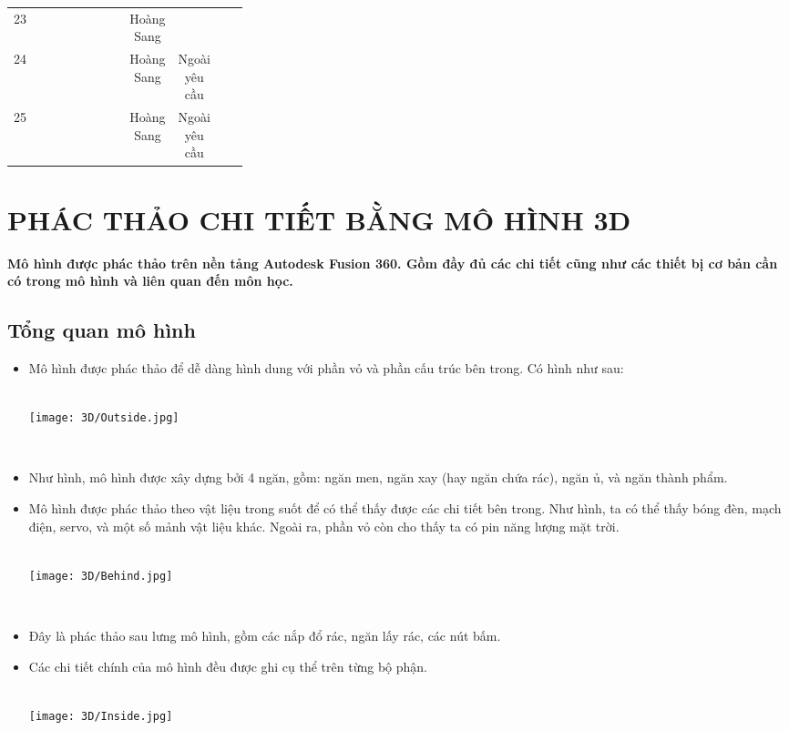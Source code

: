 \documentclass[12pt, a4paper]{article}
\begin{document}
\begin{table}[!H]
\begin{tabular}{|c|c|c|p{0.3\linewidth}|c|c|c|c|}
    23 & \centering{17/8/2023} & \centering{23/8/2023} & \centering{Báo cáo chi tiết} & Hoàng Sang &  \\ \cline{1-6}

    24 & \centering{10/8/2023} & \centering{15/8/2023} & \centering{Tìm hiểu về JSON và cách làm việc với JSON bằng Node-red, JS và C++} & Hoàng Sang &  Ngoài yêu cầu \\ \cline{1-6}

    25 & \centering{10/8/2023} & \centering{15/8/2023} & \centering{Tạo bộ api từ mạch gửi lên website} & Hoàng Sang & Ngoài yêu cầu \\ \cline{1-6}
    
    \end{tabular}
\end{table}
\newpage
{}
\setcounter{page}{13}
\section{PHÁC THẢO CHI TIẾT BẰNG MÔ HÌNH 3D}
\textbf{Mô hình được phác thảo trên nền tảng Autodesk Fusion 360. Gồm đầy đủ các chi tiết cũng như các thiết bị cơ bản cần có trong mô hình và liên quan đến môn học.}

\subsection{Tổng quan mô hình}
\begin{itemize}
    \item Mô hình được phác thảo để dễ dàng hình dung với phần vỏ và phần cấu trúc bên trong. Có hình như sau: \\ \\
    \centerline{\texttt{[image: 3D/Outside.jpg]}} \\ 
    \item Như hình, mô hình được xây dựng bởi 4 ngăn, gồm: ngăn men, ngăn xay (hay ngăn chứa rác), ngăn ủ, và ngăn thành phẩm. 
    \item Mô hình được phác thảo theo vật liệu trong suốt để có thể thấy được các chi tiết bên trong. Như hình, ta có thể thấy bóng đèn, mạch điện, servo, và một số mảnh vật liệu khác. Ngoài ra, phần vỏ còn cho thấy ta có pin năng lượng mặt trời. \\ \\
    \centerline{\texttt{[image: 3D/Behind.jpg]}} \\ 
    \item Đây là phác thảo sau lưng mô hình, gồm các nắp đổ rác, ngăn lấy rác, các nút bấm.
    \item Các chi tiết chính của mô hình đều được ghi cụ thể trên từng bộ phận. \\ \\
    \centerline{\texttt{[image: 3D/Inside.jpg]}} \\
\end{itemize}
\end{document}
